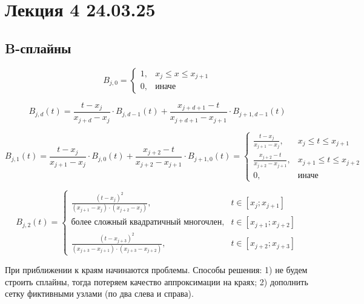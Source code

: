 \section{Лекция 4 24.03.25}

\subsection{B-сплайны}

\begin{equation}
    B_{j,0} = \begin{cases}  
        1, & x_j \leq x \leq x_{j+1} \\
        0, & \text{иначе}
    \end{cases}
\end{equation}

\begin{equation}
    B_{j,d}(t) = \frac{t - x_j}{x_{j+d} - x_j} \cdot B_{j, d-1}(t) + 
    \frac{x_{j+d+1} - t}{x_{j+d+1} - x_{j+1}} \cdot B_{j+1, d-1}(t)
\end{equation}

\begin{equation}
    B_{j,1}(t) = \frac{t - x_j}{x_{j+1} - x_j} \cdot B_{j, 0}(t) +
        \frac{x_{j+2} - t}{x_{j+2} - x_{j+1}} \cdot B_{j+1, 0}(t) = \begin{cases}
        \frac{t - x_j}{x_{j+1} - x_j}, & x_j \leq t \leq x_{j+1}\\
        \frac{x_{j+2} - t}{x_{j+2} - x_{j+1}}, & x_{j+1} \leq t \leq x_{j+2}\\
        0, & \text{иначе}
    \end{cases}
\end{equation}

\begin{equation}
    B_{j,2}(t) = \begin{cases}
        \frac{(t - x_j)^2}{(x_{j+1} - x_j) \cdot (x_{j+2} - x_j)}, & t \in [x_j; x_{j+1}]\\
        \text{более сложный квадратичный многочлен}, & t \in [x_{j+1}; x_{j+2}]\\
        \frac{(t - x_{j+3})^2}{(x_{j+3} - x_{j+1}) \cdot (x_{j+3} - x_{j+2})}, & t \in [x_{j+2}; x_{j+3}]
    \end{cases}
\end{equation}

При приближении к краям начинаются проблемы. Способы решения: 1) не будем строить сплайны, тогда потеряем качество аппроксимации на краях; 2) дополнить сетку фиктивными узлами (по два слева и справа).

